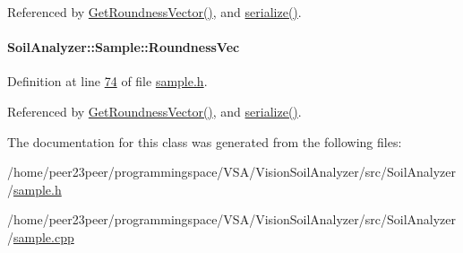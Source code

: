 Referenced by \hyperlink{sample_8cpp_source_l00083}{Get\+Roundness\+Vector()}, and \hyperlink{sample_8h_source_l00085}{serialize()}.

\hypertarget{class_soil_analyzer_1_1_sample_a3f8898ff104d915b706ebbed37bac055}{}
\paragraph[{Roundness\+Vec}]{ Soil\+Analyzer\+::\+Sample\+::\+Roundness\+Vec\hspace{0.3cm}{\ttfamily [private]}}\label{class_soil_analyzer_1_1_sample_a3f8898ff104d915b706ebbed37bac055}


Definition at line \hyperlink{sample_8h_source_l00074}{74} of file \hyperlink{sample_8h_source}{sample.\+h}.



Referenced by \hyperlink{sample_8cpp_source_l00083}{Get\+Roundness\+Vector()}, and \hyperlink{sample_8h_source_l00085}{serialize()}.



The documentation for this class was generated from the following files\+:\begin{DoxyCompactItemize}
\item 
/home/peer23peer/programmingspace/\+V\+S\+A/\+Vision\+Soil\+Analyzer/src/\+Soil\+Analyzer/\hyperlink{sample_8h}{sample.\+h}\item 
/home/peer23peer/programmingspace/\+V\+S\+A/\+Vision\+Soil\+Analyzer/src/\+Soil\+Analyzer/\hyperlink{sample_8cpp}{sample.\+cpp}\end{DoxyCompactItemize}
